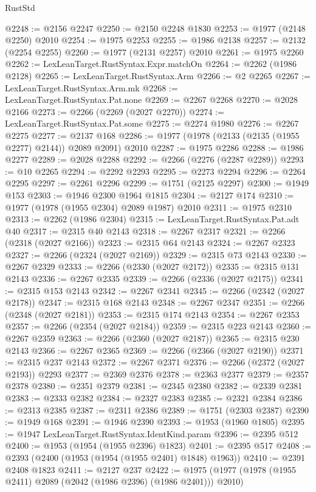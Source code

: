 \begin{lexlean}{RustStd}
\begin{coremodule}
@2248 := @2156 @2247
@2250 := @2150 @2248 @1830
@2253 := @1977 (@2148 @2250) @2010
@2254 := @1975 @2253
@2255 := @1986 @2138
@2257 := @2132 (@2254 @2255)
@2260 := @1977 (@2131 @2257) @2010
@2261 := @1975 @2260
@2262 := LexLeanTarget.RustSyntax.Expr.matchOn
@2264 := @2262 (@1986 @2128)
@2265 := LexLeanTarget.RustSyntax.Arm
@2266 := @2 @2265
@2267 := LexLeanTarget.RustSyntax.Arm.mk
@2268 := LexLeanTarget.RustSyntax.Pat.none
@2269 := @2267 @2268
@2270 := @2028 @2166
@2273 := @2266 (@2269 (@2027 @2270))
@2274 := LexLeanTarget.RustSyntax.Pat.some
@2275 := @2274 @1980
@2276 := @2267 @2275
@2277 := @2137 @168
@2286 := @1977 (@1978 (@2133 (@2135 (@1955 @2277) @2144)) @2089 @2091) @2010
@2287 := @1975 @2286
@2288 := @1986 @2277
@2289 := @2028 @2288
@2292 := @2266 (@2276 (@2287 @2289))
@2293 := @10 @2265
@2294 := @2292 @2293
@2295 := @2273 @2294
@2296 := @2264 @2295
@2297 := @2261 @2296
@2299 := @1751 (@2125 @2297)
@2300 := @1949 @153
@2303 := @1946 @2300 @1964 @1815
@2304 := @2127 @174
@2310 := @1977 (@1978 (@1955 @2304) @2089 @1987) @2010
@2311 := @1975 @2310
@2313 := @2262 (@1986 @2304)
@2315 := LexLeanTarget.RustSyntax.Pat.adt @40
@2317 := @2315 @40 @2143
@2318 := @2267 @2317
@2321 := @2266 (@2318 (@2027 @2166))
@2323 := @2315 @64 @2143
@2324 := @2267 @2323
@2327 := @2266 (@2324 (@2027 @2169))
@2329 := @2315 @73 @2143
@2330 := @2267 @2329
@2333 := @2266 (@2330 (@2027 @2172))
@2335 := @2315 @131 @2143
@2336 := @2267 @2335
@2339 := @2266 (@2336 (@2027 @2175))
@2341 := @2315 @153 @2143
@2342 := @2267 @2341
@2345 := @2266 (@2342 (@2027 @2178))
@2347 := @2315 @168 @2143
@2348 := @2267 @2347
@2351 := @2266 (@2348 (@2027 @2181))
@2353 := @2315 @174 @2143
@2354 := @2267 @2353
@2357 := @2266 (@2354 (@2027 @2184))
@2359 := @2315 @223 @2143
@2360 := @2267 @2359
@2363 := @2266 (@2360 (@2027 @2187))
@2365 := @2315 @230 @2143
@2366 := @2267 @2365
@2369 := @2266 (@2366 (@2027 @2190))
@2371 := @2315 @237 @2143
@2372 := @2267 @2371
@2376 := @2266 (@2372 (@2027 @2193)) @2293
@2377 := @2369 @2376
@2378 := @2363 @2377
@2379 := @2357 @2378
@2380 := @2351 @2379
@2381 := @2345 @2380
@2382 := @2339 @2381
@2383 := @2333 @2382
@2384 := @2327 @2383
@2385 := @2321 @2384
@2386 := @2313 @2385
@2387 := @2311 @2386
@2389 := @1751 (@2303 @2387)
@2390 := @1949 @168
@2391 := @1946 @2390
@2393 := @1953 (@1960 @1805)
@2395 := @1947 LexLeanTarget.RustSyntax.IdentKind.param
@2396 := @2395 @512
@2400 := @1953 (@1954 (@1955 @2396) @1823)
@2401 := @2395 @517
@2408 := @2393 (@2400 (@1953 (@1954 (@1955 @2401) @1848) @1963))
@2410 := @2391 @2408 @1823
@2411 := @2127 @237
@2422 := @1975 (@1977 (@1978 (@1955 @2411) @2089 (@2042 (@1986 @2396) (@1986 @2401))) @2010)

\end{coremodule}
\end{lexlean}
